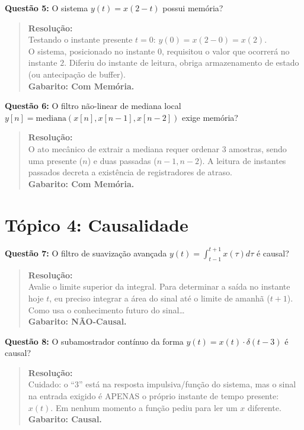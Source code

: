 \textbf{Questão 5:} O sistema \(y(t) = x(2-t)\) possui memória?

\begin{quote}
\textbf{Resolução:}\\
Testando o instante presente \(t=0\): \(y(0) = x(2-0) = x(2)\).\\
O sistema, posicionado no instante \(0\), requisitou o valor que ocorrerá no instante \(2\). Diferiu do instante de leitura, obriga armazenamento de estado (ou antecipação de buffer).\\
\textbf{Gabarito: Com Memória.}
\end{quote}

\textbf{Questão 6:} O filtro não-linear de mediana local \(y[n] = \text{mediana}(x[n], x[n-1], x[n-2])\) exige memória?

\begin{quote}
\textbf{Resolução:}\\
O ato mecânico de extrair a mediana requer ordenar 3 amostras, sendo uma presente (\(n\)) e duas passadas (\(n-1, n-2\)). A leitura de instantes passados decreta a existência de registradores de atraso.\\
\textbf{Gabarito: Com Memória.}
\end{quote}

\section{Tópico 4: Causalidade}\label{tuxf3pico-4-causalidade}

\textbf{Questão 7:} O filtro de suavização avançada \(y(t) = \int_{t-1}^{t+1} x(\tau) d\tau\) é causal?

\begin{quote}
\textbf{Resolução:}\\
Avalie o limite superior da integral. Para determinar a saída no instante hoje \(t\), eu preciso integrar a área do sinal até o limite de amanhã (\(t+1\)). Como usa o conhecimento futuro do sinal\ldots{}\\
\textbf{Gabarito: NÃO-Causal.}
\end{quote}

\textbf{Questão 8:} O subamostrador contínuo da forma \(y(t) = x(t) \cdot \delta(t-3)\) é causal?

\begin{quote}
\textbf{Resolução:}\\
Cuidado: o ``3'' está na resposta impulsiva/função do sistema, mas o sinal na entrada exigido é APENAS o próprio instante de tempo presente: \(x(t)\). Em nenhum momento a função pediu para ler um \(x\) diferente.\\
\textbf{Gabarito: Causal.}
\end{quote}

